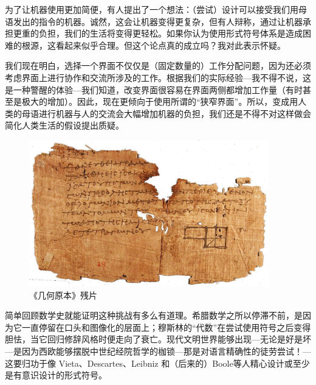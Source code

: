 \documentclass[a4paper,12pt]{article}
\begin{document}
为了让机器使用更加简便，有人提出了一个想法：（尝试）设计可以接受我们用母语发出的指令的机器。诚然，这会让机器变得更复杂，但有人辩称，通过让机器承担更重的负担，我们的生活将变得更轻松。如果你认为使用形式符号体系是造成困难的根源，这看起来似乎合理。但这个论点真的成立吗？我对此表示怀疑。

我们现在明白，选择一个界面不仅仅是（固定数量的）工作分配问题，因为还必须考虑界面上进行协作和交流所涉及的工作。根据我们的实际经验—我不得不说，这是一种警醒的体验—我们知道，改变界面很容易在界面两侧都增加工作量（有时甚至是极大的增加）。因此，现在更倾向于使用所谓的“狭窄界面”。所以，变成用人类的母语进行机器与人的交流会大幅增加机器的负担，我们还是不得不对这样做会简化人类生活的假设提出质疑。

\begin{figure}[ht]
    \centering
    \includegraphics[height=2.5in]{images/elements.jpeg}
    \caption{《几何原本》残片}
\end{figure}

简单回顾数学史就能证明这种挑战有多么有道理。希腊数学之所以停滞不前，是因为它一直停留在口头和图像化的层面上；穆斯林的“代数”在尝试使用符号之后变得胆怯，当它回归修辞风格时便走向了衰亡。现代文明世界能够出现—无论是好是坏—是因为西欧能够摆脱中世纪经院哲学的枷锁—那是对语言精确性的徒劳尝试！—这要归功于像 Vieta、Descartes、Leibniz 和（后来的）Boole等人精心设计或至少是有意识设计的形式符号。
\end{document}

